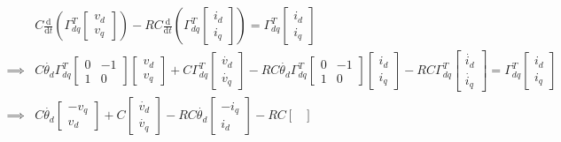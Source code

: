 \begin{align*}
	&C\frac{\text{d}}{\text{d}t}\left(\Gamma_{dq}^T\begin{bmatrix}
		v_d\\v_q
	\end{bmatrix}\right)-RC\frac{\text{d}}{\text{d}t}\left(\Gamma_{dq}^T\begin{bmatrix}
		i_d\\i_q
	\end{bmatrix}\right) = \Gamma_{dq}^T\begin{bmatrix}
		i_d\\i_q
	\end{bmatrix}\\
	\implies & C\dot{\theta_d}\Gamma_{dq}^T\begin{bmatrix}
		0&-1\\1&0
	\end{bmatrix}\begin{bmatrix}
		v_d\\v_q
	\end{bmatrix}+C\Gamma_{dq}^T\begin{bmatrix}
		\dot{v_d}\\\dot{v_q}
	\end{bmatrix} - RC \dot{\theta_d}\Gamma_{dq}^T\begin{bmatrix}
		0&-1\\1&0
	\end{bmatrix}\begin{bmatrix}
		i_d\\i_q
	\end{bmatrix}-RC\Gamma_{dq}^T\begin{bmatrix}
		\dot{i_d}\\\dot{i_q}
	\end{bmatrix} = \Gamma_{dq}^T\begin{bmatrix}
		i_d\\i_q
	\end{bmatrix}\\
	\implies & C\dot{\theta_d}\begin{bmatrix}
		-v_q\\v_d
	\end{bmatrix}+C\begin{bmatrix}
		\dot{v_d}\\\dot{v_q}
	\end{bmatrix}-RC\dot{\theta_d}\begin{bmatrix}
		-i_q\\i_d
	\end{bmatrix}-RC\begin{bmatrix}

\end{bmatrix}
\end{align*}
